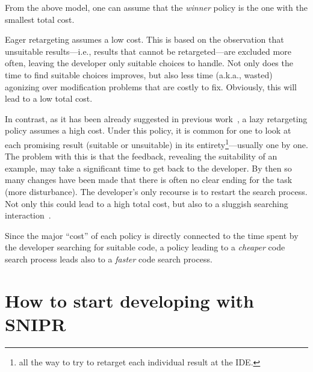 From the above model, one can assume that the \emph{winner} policy is the one with the smallest total cost.

Eager retargeting assumes a low cost. This is based on the observation that unsuitable results---i.e., results that cannot be retargeted---are excluded more often, leaving the developer only suitable choices to handle. Not only does the time to find suitable choices improves, but also less time (a.k.a., wasted) agonizing over modification problems that are costly to fix. Obviously, this will lead to a low total cost. 

In contrast, as it has been already suggested in previous work~\cite{Brandt:2009ew, Wightman:2012gc}, a lazy retargeting policy assumes a high cost. Under this policy, it is common for one to look at each promising result (suitable or unsuitable) in its entirety\footnote{all the way to try to retarget each individual result at the IDE.}---usually one by one. The problem with this is that the feedback, revealing the suitability of an example, may take a significant time to get back to the developer. By then so many changes have been made that there is often no clear ending for the task (more disturbance). The developer's only recourse is to restart the search process. Not only this could lead to a high total cost, but also to a sluggish searching interaction~\cite{Gray:2000im}.  

Since the major ``cost'' of each policy is directly connected to the time spent by the developer searching for suitable code, a policy leading to a \emph{cheaper} code search process leads also to a \emph{faster} code search process.

% 
% 
% 


\section{How to start developing with \uppercase{SnipR}}
\label{sec:sniprscenario}

